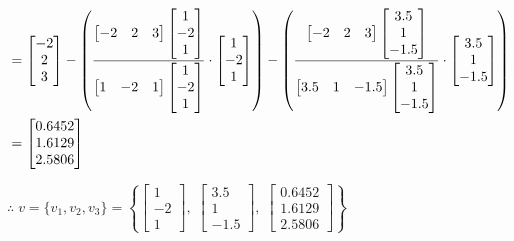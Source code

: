 \documentclass[a4paper]{article}
\begin{document}
\begin{qalist}
\begin{align}
				\notag &= \begin{bmatrix}-2 \\ 2 \\ 3\end{bmatrix} - \left(\frac{\begin{bmatrix}-2 & 2 & 3\end{bmatrix}\begin{bmatrix}1 \\ -2 \\ 1\end{bmatrix}}{\begin{bmatrix}1 & -2 & 1\end{bmatrix}\begin{bmatrix}1 \\ -2 \\ 1\end{bmatrix}} \cdot \begin{bmatrix}1 \\ -2 \\ 1\end{bmatrix}\right) - \left(\frac{\begin{bmatrix}-2 & 2 & 3\end{bmatrix}\begin{bmatrix}3.5 \\ 1 \\ -1.5\end{bmatrix}}{\begin{bmatrix}3.5 & 1 & -1.5\end{bmatrix}\begin{bmatrix}3.5 \\ 1 \\ -1.5\end{bmatrix}} \cdot \begin{bmatrix}3.5 \\ 1 \\ -1.5\end{bmatrix}\right) \\
				\notag &= \begin{bmatrix}0.6452 \\ 1.6129 \\ 2.5806\end{bmatrix}
			\end{align}
			
			$\therefore \; v =\{{v}_{1}, {v}_{2}, {v}_{3}\} = \left\{\begin{bmatrix}1 \\ -2 \\ 1\end{bmatrix},\;\begin{bmatrix}3.5 \\ 1 \\ -1.5\end{bmatrix},\;\begin{bmatrix}0.6452 \\ 1.6129 \\ 2.5806\end{bmatrix}\right\}$ 
			

\end{qalist}
\end{document}
